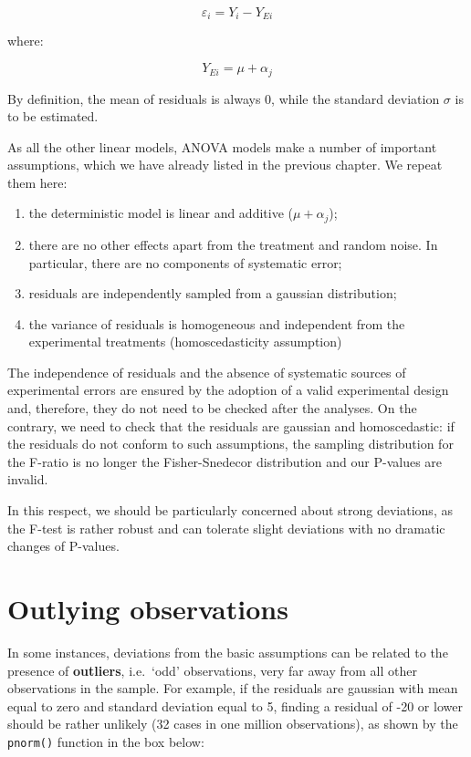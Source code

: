 \documentclass[a4paper,12pt,oneside]{book}
\providecommand{\tightlist}{%
  \setlength{\itemsep}{0pt}\setlength{\parskip}{0pt}}
\begin{document}
\[\varepsilon_i = Y_i - Y_{Ei}\]

where:

\[Y_{Ei} = \mu + \alpha_j\]

By definition, the mean of residuals is always 0, while the standard deviation \(\sigma\) is to be estimated.

As all the other linear models, ANOVA models make a number of important assumptions, which we have already listed in the previous chapter. We repeat them here:

\begin{enumerate}
\def\labelenumi{\arabic{enumi}.}
\tightlist
\item
  the deterministic model is linear and additive (\(\mu + \alpha_j\));
\item
  there are no other effects apart from the treatment and random noise. In particular, there are no components of systematic error;
\item
  residuals are independently sampled from a gaussian distribution;
\item
  the variance of residuals is homogeneous and independent from the experimental treatments (homoscedasticity assumption)
\end{enumerate}

The independence of residuals and the absence of systematic sources of experimental errors are ensured by the adoption of a valid experimental design and, therefore, they do not need to be checked after the analyses. On the contrary, we need to check that the residuals are gaussian and homoscedastic: if the residuals do not conform to such assumptions, the sampling distribution for the F-ratio is no longer the Fisher-Snedecor distribution and our P-values are invalid.

In this respect, we should be particularly concerned about strong deviations, as the F-test is rather robust and can tolerate slight deviations with no dramatic changes of P-values.

\hypertarget{outlying-observations}{%
\section{Outlying observations}\label{outlying-observations}}

In some instances, deviations from the basic assumptions can be related to the presence of \textbf{outliers}, i.e.~`odd' observations, very far away from all other observations in the sample. For example, if the residuals are gaussian with mean equal to zero and standard deviation equal to 5, finding a residual of -20 or lower should be rather unlikely (32 cases in one million observations), as shown by the \texttt{pnorm()} function in the box below:
\end{document}

